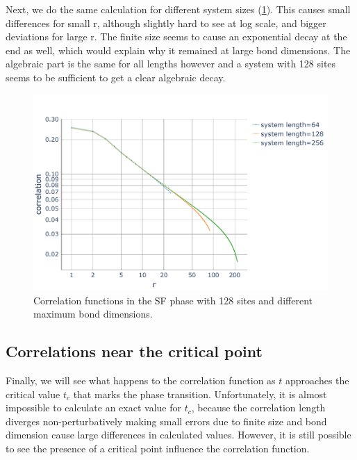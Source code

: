 \documentclass[twoside,twocolumn,9pt]{article}
\begin{document}
Next, we do the same calculation for different system sizes (\cref{fig:lengths}). This causes small differences for small r, although slightly hard to see at log scale, and bigger deviations for large r. The finite size seems to cause an exponential decay at the end as well, which would explain why it remained at large bond dimensions. The algebraic part is the same for all lengths however and a system with 128 sites seems to be sufficient to get a clear algebraic decay.
\begin{center}
  \begin{figure}
      \includegraphics[width=\linewidth]{../code/figures/Correlations-lengths.pdf}
      \caption{Correlation functions in the SF phase with 128 sites and different maximum bond dimensions.}
      \label{fig:lengths}
  \end{figure}
\end{center}

\subsection{Correlations near the critical point}
Finally, we will see what happens to the correlation function as $t$ approaches the critical value $t_c$ that marks the phase transition. Unfortunately, it is almost impossible to calculate an exact value for $t_c$, because the correlation length diverges non-perturbatively making small errors due to finite size and bond dimension cause large differences in calculated values. However, it is still possible to see the presence of a critical point influence the correlation function. 
\end{document}
